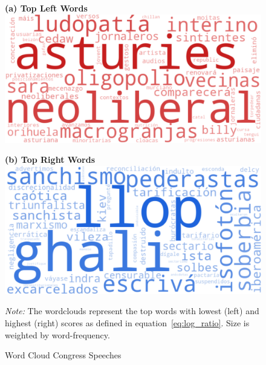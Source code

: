 \documentclass[12pt]{article}
\begin{document}
\begin{figure}[htbp!]
	\caption{Word Cloud Congress Speeches}
	
	\centering
	\begin{minipage}{0.46\textwidth}
		\centering
		\textbf{(a) Top Left Words}\\[1ex]
		\includegraphics[width=\linewidth]{figures/congress_left.pdf}
	\end{minipage}%
	\hfill
	\begin{minipage}{0.46\textwidth}
		\centering
		\textbf{(b) Top Right Words}\\[1ex]
		\includegraphics[width=\linewidth]{figures/congress_right.pdf}
	\end{minipage}
	
	
	
	\vspace{0.5ex}
	
	{\small
		\textit{Note:} The wordclouds represent the top words with lowest (left) and highest (right) scores as defined in equation~\ref{eq:log_ratio}. Size is weighted by word-frequency.
	}
	\label{fig:wordcloud}	
\end{figure}
\end{document}
